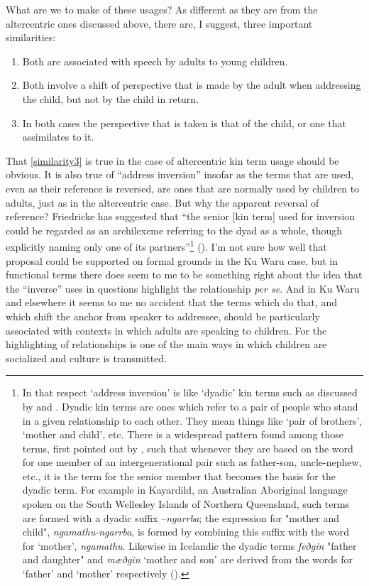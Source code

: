 \documentclass[output=paper]{langsci/langscibook}
\begin{document}
What are we to make of these usages? As different as they are from the altercentric ones discussed above, there are, I suggest, three important similarities:

\begin{enumerate}
	\item Both are associated with speech by adults to young children.
	\item Both involve a shift of perspective that is made by the adult when addressing the child, but not by the child in return.
	\item In both cases the perspective that is taken is that of the child, or one that assimilates to it.\label{similarity3}
\end{enumerate}

That \ref{similarity3} is true in the case of altercentric kin term usage should be obvious. It is also true of “address inversion” insofar as the terms that are used, even as their reference is reversed, are ones that are normally used by children to adults, just as in the altercentric case. But why the apparent reversal of reference?  Friedricke \citet{Braun1988} has suggested that “the senior [kin term] used for inversion could be regarded as an archilexeme referring to the dyad as a whole, though explicitly naming only one of its partners”\footnote{In that respect ‘address inversion’ is like ‘dyadic’ kin terms such as discussed by \cite{MerlanJeffrey1982} and \cite{Evans2006a}. Dyadic kin terms are ones which refer to a pair of people who stand in a given relationship to each other. They mean things like ‘pair of brothers’, ‘mother and child’, etc.  There is a widespread pattern found among those terms, first pointed out by \cite{MerlanJeffrey1982}, such that whenever they are based on the word for one member of an intergenerational pair such as father-son, uncle-nephew, etc., it is the term for the senior member that becomes the basis for the dyadic term. For example in Kayardild, an Australian Aboriginal language spoken on the South Wellesley Islands of Northern Queensland, such terms are formed with a dyadic suffix –\textit{ngarrba}; the expression for "mother and child", \textit{ngamathu-ngarrba}, is formed by combining this suffix with the word for ‘mother’, \textit{ngamathu}. Likewise in Icelandic the dyadic terms \textit{feðgin} "father and daughter" and \textit{mæðgin} ‘mother and son’ are derived from the words for ‘father’ and ‘mother’ respectively (\citealt{Evans2006a}).} (\citealt[285]{Braun1988}). I’m not sure how well that proposal could be supported on formal grounds in the Ku Waru case, but in functional terms there does seem to me to be something right about the idea that the “inverse” uses in questions highlight the relationship \textit{per se}. And in Ku Waru and elsewhere it seems to me no accident that the terms which do that, and which shift the anchor from speaker to addressee, should be particularly associated with contexts in which adults are speaking to children. For the highlighting of relationships is one of the main ways in which children are socialized and culture is transmitted.
\end{document}
